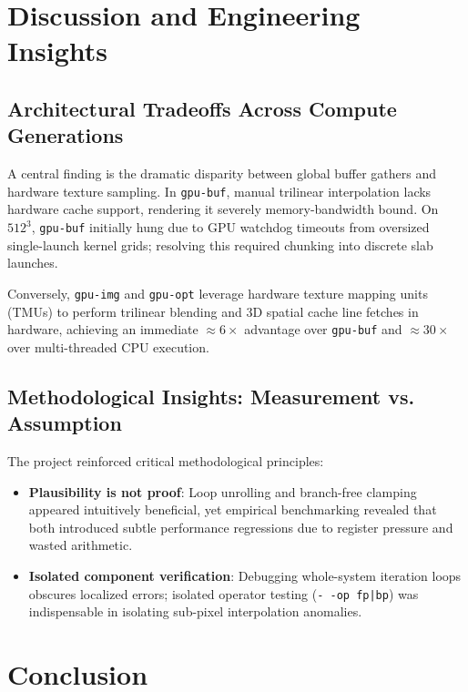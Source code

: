 \documentclass[11pt,a4paper]{article}
\begin{document}
\section{Discussion and Engineering Insights}
\label{sec:discussion}

\subsection{Architectural Tradeoffs Across Compute Generations}
A central finding is the dramatic disparity between global buffer gathers and hardware texture sampling. In \texttt{gpu-buf}, manual trilinear interpolation lacks hardware cache support, rendering it severely memory-bandwidth bound. On $512^3$, \texttt{gpu-buf} initially hung due to GPU watchdog timeouts from oversized single-launch kernel grids; resolving this required chunking into discrete slab launches.

Conversely, \texttt{gpu-img} and \texttt{gpu-opt} leverage hardware texture mapping units (TMUs) to perform trilinear blending and 3D spatial cache line fetches in hardware, achieving an immediate $\approx 6\times$ advantage over \texttt{gpu-buf} and $\approx 30\times$ over multi-threaded CPU execution.

\subsection{Methodological Insights: Measurement vs. Assumption}
The project reinforced critical methodological principles:
\begin{itemize}[noitemsep]
    \item \textbf{Plausibility is not proof}: Loop unrolling and branch-free clamping appeared intuitively beneficial, yet empirical benchmarking revealed that both introduced subtle performance regressions due to register pressure and wasted arithmetic.
    \item \textbf{Isolated component verification}: Debugging whole-system iteration loops obscures localized errors; isolated operator testing (\texttt{-\,-op fp|bp}) was indispensable in isolating sub-pixel interpolation anomalies.
\end{itemize}

\section{Conclusion}
\label{sec:conclusion}
\end{document}
